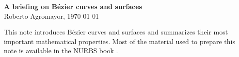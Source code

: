 \documentclass[11pt]{article}
\newcommand{\Bezier}[0]{B\'{e}zier }
\begin{document}
\thispagestyle{empty}

\begin{center}
{\LARGE \bf A briefing on \Bezier curves and surfaces}\\
\vspace{2ex}
{\large Roberto Agromayor, \today }\\
\end{center}

This note introduces \Bezier curves and surfaces and summarizes their most important mathematical properties. Most of the material used to prepare this note is available in the NURBS book \parencite[Chapter 1]{NURBS_book}.


\clearpage



\printbibliography
\end{document}
